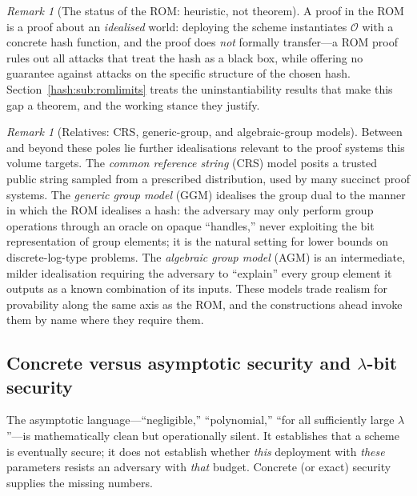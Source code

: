\documentclass[11pt,a4paper]{article}
\theoremstyle{definition}
\theoremstyle{remark}
\newtheorem{remark}[theorem]{Remark}
\begin{document}
\begin{remark}[The status of the ROM: heuristic, not theorem]\label{model:rem:rom-caveat}
A proof in the ROM is a proof about an \emph{idealised} world: deploying the
scheme instantiates \(\mathcal{O}\) with a concrete hash function, and the proof
does \emph{not} formally transfer---a ROM proof rules out all attacks that treat
the hash as a black box, while offering no guarantee against attacks on the
specific structure of the chosen hash. Section~\ref{hash:sub:romlimits} treats
the uninstantiability results that make this gap a theorem, and the working
stance they justify.
\end{remark}

\begin{remark}[Relatives: CRS, generic-group, and algebraic-group models]\label{model:rem:other-models}
Between and beyond these poles lie further idealisations relevant to the proof
systems this volume targets. The \emph{common reference string} (CRS) model
posits a trusted public string sampled from a prescribed distribution, used by
many succinct proof systems. The \emph{generic group model} (GGM) idealises the
group dual to the manner in which the ROM idealises a hash: the adversary may only perform group
operations through an oracle on opaque ``handles,'' never exploiting the bit
representation of group elements; it is the natural setting for lower bounds on
discrete-log-type problems. The \emph{algebraic group model} (AGM) is an
intermediate, milder idealisation requiring the adversary to ``explain'' every
group element it outputs as a known combination of its inputs. These models trade
realism for provability along the same axis as the ROM, and the constructions
ahead invoke them by name where they require them.
\end{remark}

\subsection{Concrete versus asymptotic security and \(\lambda\)-bit security}\label{model:subsec:concrete}

The asymptotic language---``negligible,'' ``polynomial,'' ``for all sufficiently
large \(\lambda\)''---is mathematically clean but operationally silent. It establishes
that a scheme is eventually secure; it does not establish whether \emph{this}
deployment with \emph{these} parameters resists an adversary with \emph{that}
budget. Concrete (or exact) security supplies the missing numbers.
\end{document}
